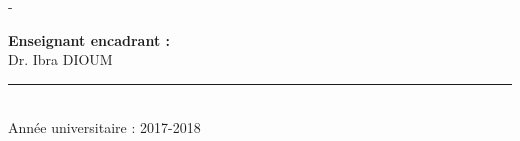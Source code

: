 \begin{titlingpage}
\begin{SingleSpace}
\begin{adjustwidth*}{\unitlength}{-\unitlength}
\begin{center}
				\begin{minipage}[t]{0.33333\textwidth}
					\centering
					{\textbf{Enseignant encadrant :} }\\
					{{Dr. Ibra DIOUM}}\\
				\end{minipage}
				\vspace{6mm}
				\hrule~\\[0.1cm]
				\vspace{12mm}
				{Année universitaire : 2017-2018 }~\\[0.1cm]
			\end{center}
		\end{adjustwidth*}
	\end{SingleSpace}
\end{titlingpage}
\clearpage
